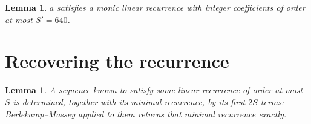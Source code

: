\documentclass[11pt,a4paper]{article}
\theoremstyle{plain}
\newtheorem{lemma}[theorem]{Lemma}
\theoremstyle{definition}
\begin{document}
\begin{lemma}\label{lem:cf}
$a$ satisfies a monic linear recurrence with integer coefficients of order at most
$S'=640$.
\end{lemma}

\section{Recovering the recurrence}

\begin{lemma}\label{lem:bm}
A sequence known to satisfy some linear recurrence of order at most $S$ is determined, together
with its minimal recurrence, by its first $2S$ terms: Berlekamp--Massey applied to them returns
that minimal recurrence exactly.
\end{lemma}
\end{document}
